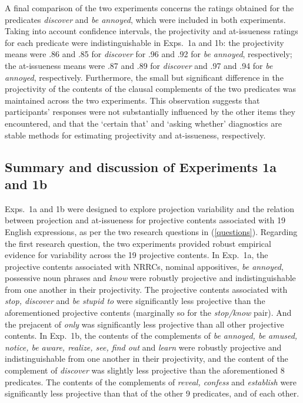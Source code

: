 \documentclass[11pt,fleqn]{article}
\newcommand{\6}{\mbox{$[\hspace*{-.6mm}[$}}
\newcommand{\9}{\mbox{$]\hspace*{-.6mm}]$}}
\begin{document}
A final comparison of the two experiments concerns the ratings obtained for the predicates {\em discover} and {\em be annoyed}, which were included in both experiments. Taking into account confidence intervals, the projectivity and at-issueness ratings for each predicate were indistinguishable in Exps.~1a and 1b: the projectivity means were .86 and .85 for {\em discover} for .96 and .92 for \emph{be annoyed}, respectively; the at-issueness means were .87 and .89 for \emph{discover} and .97 and .94 for \emph{be annoyed}, respectively. Furthermore, the small but significant difference in the projectivity of the contents of the clausal complements of the two predicates was maintained across the two experiments. This observation suggests that participants' responses were not substantially influenced by the other items they encountered, and that the `certain that' and `asking whether' diagnostics are stable methods for estimating projectivity and at-issueness, respectively.

\subsection{Summary and discussion of Experiments 1a and 1b}\label{s-summary1a1b}

Exps.~1a and 1b were designed to explore projection variability and the relation between projection and at-issueness for projective contents associated with 19 English expressions, as per the two research questions in (\ref{questions}). Regarding the first research question, the two experiments provided robust empirical evidence for variability across the 19 projective contents. In Exp.~1a, the projective contents associated with NRRCs, nominal appositives, {\em be annoyed}, possessive noun phrases and {\em know} were robustly projective and indistinguishable from one another in their projectivity. The projective contents associated with {\em stop, discover} and {\em be stupid to} were significantly less projective than the aforementioned projective contents (marginally so for the {\em stop/know} pair). And the prejacent of {\em only} was significantly less projective than all other projective contents. In Exp.~1b, the contents of the complements of {\em be annoyed, be amused, notice, be aware, realize, see, find out} and {\em learn} were robustly projective and indistinguishable from one another in their projectivity, and the content of the complement of {\em discover} was slightly less projective than the aforementioned 8 predicates. The contents of the complements of {\em reveal, confess} and {\em establish} were significantly less projective than that of the other 9 predicates, and of each other. 
\end{document}
